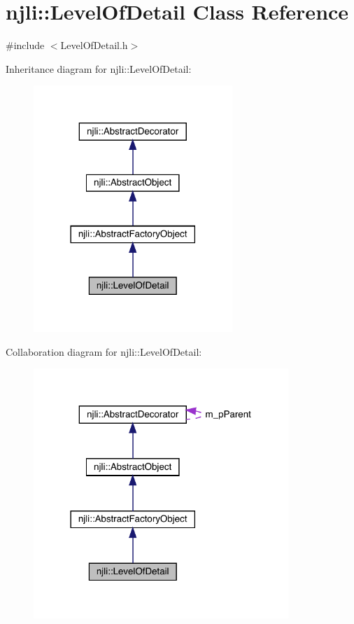 \hypertarget{classnjli_1_1_level_of_detail}{}\section{njli\+:\+:Level\+Of\+Detail Class Reference}
\label{classnjli_1_1_level_of_detail}


{\ttfamily \#include $<$Level\+Of\+Detail.\+h$>$}



Inheritance diagram for njli\+:\+:Level\+Of\+Detail\+:\nopagebreak
\begin{figure}[H]
\begin{center}
\leavevmode
\includegraphics[width=213pt]{classnjli_1_1_level_of_detail__inherit__graph}
\end{center}
\end{figure}


Collaboration diagram for njli\+:\+:Level\+Of\+Detail\+:\nopagebreak
\begin{figure}[H]
\begin{center}
\leavevmode
\includegraphics[width=273pt]{classnjli_1_1_level_of_detail__coll__graph}
\end{center}
\end{figure}
